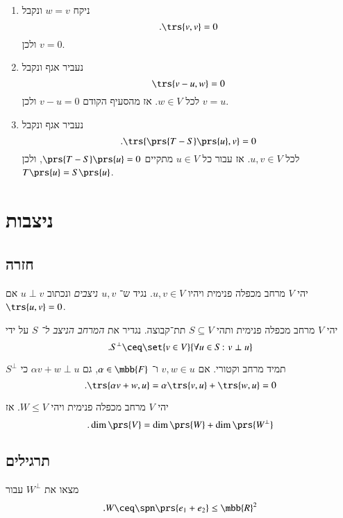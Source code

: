 \documentclass[a4paper,10pt,oneside,openany]{article}
\begin{document}
\begin{solution}
\begin{enumerate}
\item ניקח
$w = v$
ונקבל
\[\text{.} \trs{v,v} = 0\]
ולכן
$v = 0$.
\item נעביר אגף ונקבל
\[\trs{v-u, w} = 0\]
לכל
$w \in V$.
אז מהסעיף הקודם
$v-u = 0$
ולכן
$v = u$.
\item נעביר אגף ונקבל
\[\text{.} \trs{\prs{T-S}\prs{u},v} = 0\]
לכל
$u,v \in V$.
אז עבור כל
$u \in V$
מתקיים
$\prs{T-S}\prs{u} = 0$,
ולכן
$T\prs{u} = S\prs{u}$.
\end{enumerate}
\end{solution}

\section{ניצבות}

\subsection{חזרה}

\begin{definition}
יהי
$V$
מרחב מכפלה פנימית ויהיו
$u,v \in V$.
נגיד ש־%
\emph{$u,v$
ניצבים}
ונכתוב
$u \perp v$
אם
$\trs{u,v} = 0$.
\end{definition}

\begin{definition}
יהי
$V$
מרחב מכפלה פנימית ותהי
$S \subseteq V$
תת־קבוצה.
נגדיר את
\emph{המרחב הניצב ל־%
$S$}
על ידי
\[\text{.} S^\perp \ceq \set{v \in V}{\forall u \in S \colon v \perp u}\]
\end{definition}

\begin{remark}
$S^\perp$
תמיד מרחב וקטורי. אם
$v,w \in u$
ו־%
$\alpha \in \mbb{F}$,
גם
$\alpha v + w \perp u$
כי
\[\text{.} \trs{\alpha v + w, u} = \alpha \trs{v,u} + \trs{w,u} = 0\]
\end{remark}

\begin{proposition}
יהי
$V$
מרחב מכפלה פנימית ויהי
$W \leq V$.
אז
\[\text{.} \dim\prs{V} = \dim\prs{W} + \dim \prs{W^\perp}\]
\end{proposition}

\subsection{תרגילים}

\begin{exercise}
מצאו את
$W^\perp$
עבור
\[\text{.} W \ceq \spn\prs{e_1 + e_2} \leq \mbb{R}^2\]
\end{exercise}
\end{document}
